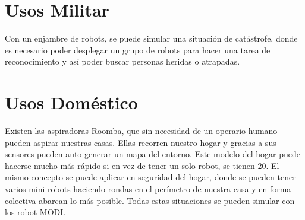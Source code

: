 \section{Usos Militar}

Con un enjambre de robots, se puede simular una situación de catástrofe, donde es necesario poder desplegar un grupo de robots para hacer una tarea de reconocimiento y así poder buscar personas heridas o atrapadas.


\section{Usos Doméstico}

Existen las aspiradoras Roomba, que sin necesidad de un operario humano pueden aspirar nuestras casas. Ellas recorren nuestro hogar y gracias a sus sensores pueden auto generar un mapa del entorno. Este modelo del hogar puede hacerse mucho más rápido si en vez de tener un solo robot, se tienen 20. El mismo concepto se puede aplicar en seguridad del hogar, donde se pueden tener varios mini robots haciendo rondas en el perímetro de nuestra casa y en forma colectiva abarcan lo más posible. Todas estas situaciones se pueden simular con los robot MODI.
